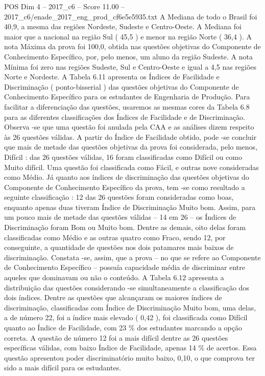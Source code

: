 \begin{textsample}{POS Dim 4 – 2017\_c6 – Score 11.00 – 2017\_c6/enade\_2017\_eng\_prod\_cf6e5e5935.txt}
A Mediana de todo o Brasil foi 40,9, a mesma das regiões Nordeste, Sudeste e Centro-Oeste.
A Mediana foi maior que a nacional na região Sul ( 45,5 ) e menor na região Norte ( 36,4 ).
A nota Máxima da prova foi 100,0, obtida nas questões objetivas do Componente de Conhecimento Específico, por, pelo menos, um aluno da região Sudeste.
A nota Mínima foi zero nas regiões Sudeste, Sul e Centro-Oeste e igual a 4,5 nas regiões Norte e Nordeste.
A Tabela 6.11 apresenta os Índices de Facilidade e Discriminação ( ponto-bisserial ) das questões objetivas do Componente de Conhecimento Específico para os estudantes de Engenharia de Produção.
Para facilitar a diferenciação das questões, usaremos as mesmas cores da Tabela 6.8 para as diferentes classificações dos Índices de Facilidade e de Discriminação.
Observa -se que uma questão foi anulada pela CAA e as análises dizem respeito às 26 questões válidas.
A partir do Índice de Facilidade obtido, pode -se concluir que mais de metade das questões objetivas da prova foi considerada, pelo menos, Difícil : das 26 questões válidas, 16 foram classificadas como Difícil ou como Muito difícil.
Uma questão foi classificada como Fácil, e outras nove consideradas como Médio.
Já quanto aos índices de discriminação das questões objetivas do Componente de Conhecimento Específico da prova, tem -se como resultado a seguinte classificação : 12 das 26 questões foram consideradas como boas, enquanto apenas duas tiveram Índice de Discriminação Muito bom.
Assim, para um pouco mais de metade das questões válidas – 14 em 26 – os Índices de Discriminação foram Bom ou Muito bom.
Dentre as demais, oito delas foram classificadas como Médio e as outras quatro como Fraco, sendo 12, por conseguinte, a quantidade de questões nos dois patamares mais baixos de discriminação.
Constata -se, assim, que a prova – no que se refere ao Componente de Conhecimento Específico – possuía capacidade média de discriminar entre aqueles que dominavam ou não o conteúdo.
A Tabela 6.12 apresenta a distribuição das questões considerando -se simultaneamente a classificação dos dois índices.
Dentre as questões que alcançaram os maiores índices de discriminação, classificadas com Índice de Discriminação Muito bom, uma delas, a de número 22, foi a índice mais elevado ( 0,42 ), foi classificada como Difícil quanto ao Índice de Facilidade, com 23 \% dos estudantes marcando a opção correta.
A questão de número 12 foi a mais difícil dentre as 26 questões específicas válidas, com baixo Índice de Facilidade, apenas 14 \% de acertos.
Essa questão apresentou poder discriminatório muito baixo, 0,10, o que comprova ter sido a mais difícil para os estudantes.

\end{textsample}
